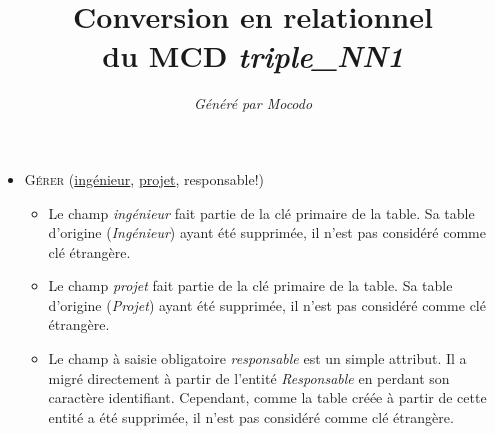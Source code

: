 \documentclass[a4paper]{article}
\title{Conversion en relationnel\\du MCD \emph{triple_NN1}}
\author{\emph{Généré par Mocodo}}
\newcommand{\relat}[1]{\textsc{#1}}
\newcommand{\attr}[1]{#1}
\newcommand{\prim}[1]{\uline{#1}}
\begin{document}
\maketitle

\begin{itemize}
  \item \relat{Gérer} (\prim{ingénieur}, \prim{projet}, \attr{responsable!})
  \begin{itemize}
    \item Le champ \emph{ingénieur} fait partie de la clé primaire de la table. Sa table d'origine (\emph{Ingénieur}) ayant été supprimée, il n'est pas considéré comme clé étrangère.
    \item Le champ \emph{projet} fait partie de la clé primaire de la table. Sa table d'origine (\emph{Projet}) ayant été supprimée, il n'est pas considéré comme clé étrangère.
    \item Le champ à saisie obligatoire \emph{responsable} est un simple attribut. Il a migré directement à partir de l'entité \emph{Responsable} en perdant son caractère identifiant. Cependant, comme la table créée à partir de cette entité a été supprimée, il n'est pas considéré comme clé étrangère.
  \end{itemize}

\end{itemize}
\end{document}
